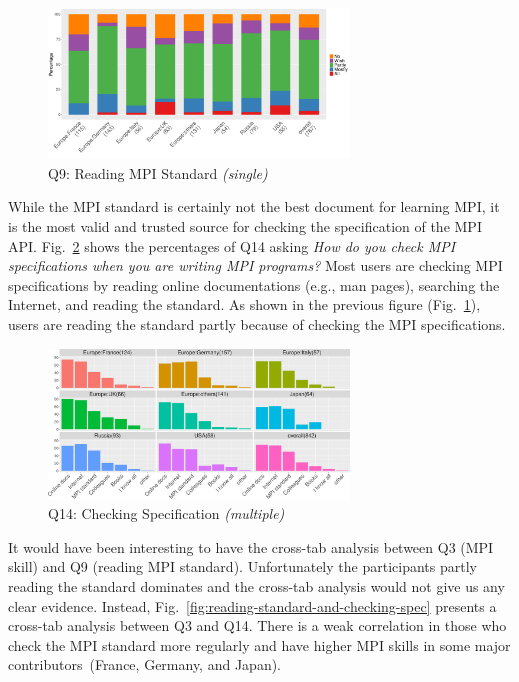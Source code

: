 \documentclass[preprint,5p,times]{elsarticle}
\def\myquote#1{{\it #1}}
\newcommand{\revision}[2]{{\color{blue}#2}}
\def\mcountries{major contributors\xspace{}}%
\begin{document}
\begin{figure}[tb]
\begin{center}
\includegraphics[width=8.0cm]{R-scripts/Q9.pdf}
\vspace{-1.5mm}
\caption{Q9: Reading MPI Standard {\it(single)}}
\label{fig:reading-standard}
\vspace{-3mm}%
\end{center}
\end{figure}

While the MPI standard is certainly not the best document for learning MPI, it
is the most valid and trusted source for checking the specification of the MPI
API. Fig.~\ref{fig:checking-spec} shows the percentages of Q14 asking
\myquote{How do you check MPI specifications when you are writing MPI
programs?} Most users are checking MPI specifications by reading online
documentations (e.g., man pages), searching the Internet, and reading the standard.
As shown in the previous figure (Fig.~\ref{fig:reading-standard}), users are
reading the standard partly because of checking the MPI specifications.

\begin{figure}[tb]
\begin{center}
\includegraphics[width=8.0cm]{R-scripts/Q14.pdf}
\vspace{-1.5mm}
\caption{Q14: Checking Specification {\it(multiple)}}
\label{fig:checking-spec}
\vspace{-3mm}%
\end{center}
\end{figure}

It would have been interesting to have the cross-tab analysis between Q3 (MPI
skill) and Q9 (reading MPI standard). Unfortunately the participants
\revision{reading the standard partly}{partly reading the standard} dominates and the cross-tab analysis would not give us any clear
evidence.
%
Instead, Fig.~\ref{fig:reading-standard-and-checking-spec} presents a cross-tab
analysis between Q3 and Q14. There is a weak correlation in those who
check the MPI standard more regularly and have higher MPI skills in some
\mcountries\  (France, Germany, and Japan).
\end{document}
